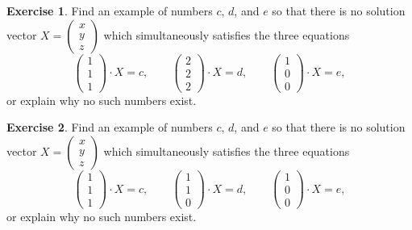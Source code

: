 \documentclass[11pt]{amsart}
\theoremstyle{definition}
\newtheorem{exercise}{Exercise}
\begin{document}
\begin{exercise}
Find an example of numbers $c$, $d$, and $e$ so that there is no solution vector $X = \left( \begin{smallmatrix} x \\ y \\ z \end{smallmatrix} \right)$ which simultaneously satisfies the three equations
\begin{equation*}
\begin{pmatrix} 1 \\ 1 \\ 1 \end{pmatrix} \cdot X = c, \qquad
\begin{pmatrix} 2 \\ 2 \\ 2 \end{pmatrix} \cdot X = d, \qquad
\begin{pmatrix} 1 \\ 0 \\ 0 \end{pmatrix} \cdot X = e,
\end{equation*}
or explain why no such numbers exist.
\end{exercise}

\begin{exercise}
Find an example of numbers $c$, $d$, and $e$ so that there is no solution vector $X = \left( \begin{smallmatrix} x \\ y \\ z \end{smallmatrix} \right)$ which simultaneously satisfies the three equations
\begin{equation*}
\begin{pmatrix} 1 \\ 1 \\ 1 \end{pmatrix} \cdot X = c, \qquad
\begin{pmatrix} 1 \\ 1 \\ 0 \end{pmatrix} \cdot X = d, \qquad
\begin{pmatrix} 1 \\ 0 \\ 0 \end{pmatrix} \cdot X = e,
\end{equation*}
or explain why no such numbers exist.
\end{exercise}
\end{document}
